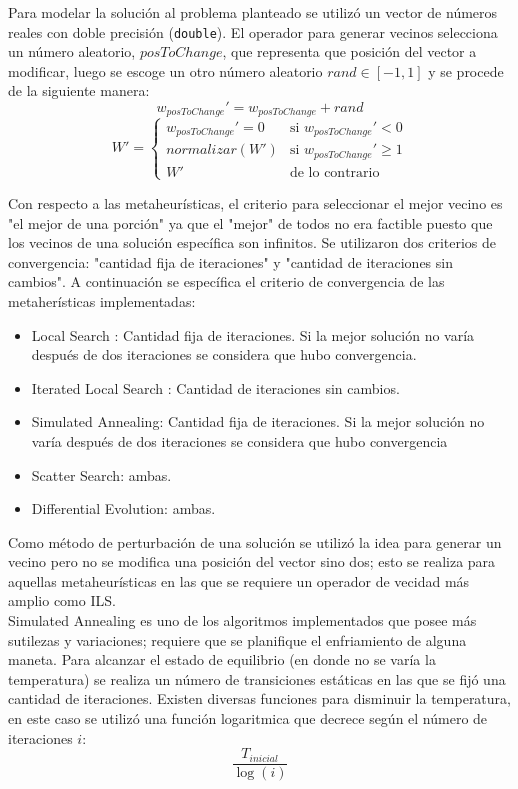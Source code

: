 \documentclass{ci5652}
\begin{document}
Para modelar la solución al problema planteado se utilizó un vector de números
reales con doble precisión (\texttt{double}). El operador para generar vecinos
selecciona un número aleatorio, $posToChange$, que representa que posición del
vector  a modificar, luego se escoge un otro número aleatorio $rand \in [-1, 1]$
y se procede de la siguiente manera:
$$w_{posToChange}' =  w_{posToChange} + rand$$
\[
  W' =
  \begin{cases}
    w_{posToChange}' = 0 & \text{si } w_{posToChange}' < 0\\
    normalizar(W')       & \text{si } w_{posToChange}' \geq 1\\
    W'                   & \text{de lo contrario}
  \end{cases}
\]

Con respecto a las metaheurísticas, el criterio para seleccionar el mejor vecino
es "el mejor de una porción" ya que el "mejor" de todos no era factible puesto que los vecinos de una solución específica son infinitos. Se utilizaron dos
criterios de convergencia: "cantidad fija de iteraciones" y "cantidad de
iteraciones sin cambios". A continuación se específica el criterio de
convergencia de las metaherísticas implementadas:

\begin{itemize}
  \item Local Search : Cantidad fija de iteraciones. Si la mejor solución no
  varía después de dos iteraciones se considera que hubo convergencia.
  \item Iterated Local Search : Cantidad de iteraciones sin cambios.
  \item Simulated Annealing: Cantidad fija de iteraciones. Si la mejor solución
  no varía después de dos iteraciones se considera que hubo convergencia
  \item Scatter Search: ambas.
  \item Differential Evolution: ambas.
\end{itemize}

Como método de perturbación de una solución se utilizó la idea para generar un
vecino pero no se modifica una posición del vector sino dos; esto se realiza
para aquellas metaheurísticas en las que se requiere un operador de vecidad
más amplio como ILS.\\

Simulated Annealing es uno de los algoritmos implementados que posee más sutilezas y variaciones; requiere que se planifique el enfriamiento de alguna maneta. Para alcanzar el estado de equilibrio (en donde no se varía la temperatura) se realiza un número de transiciones estáticas en las que se fijó una cantidad de iteraciones. Existen diversas funciones para disminuir la temperatura, en este caso se utilizó una función logaritmica que decrece según el número de iteraciones $i$: $$\frac{T_{inicial}}{\log(i)}$$
\end{document}
